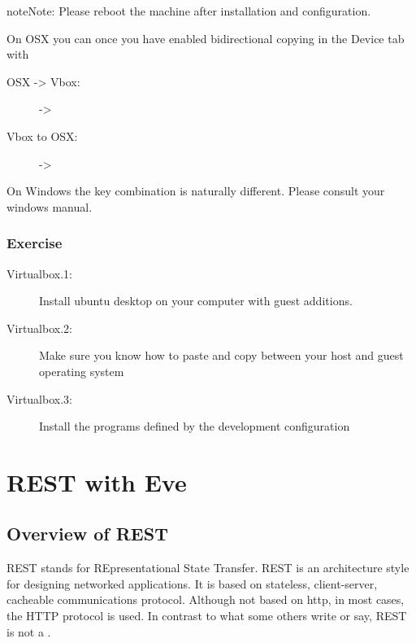 \begin{sphinxadmonition}{note}{Note:}
Please reboot the machine after installation and configuration.
\end{sphinxadmonition}

On OSX you can once you have enabled bidirectional copying in the
Device tab with
\begin{description}
\item[{OSX -\textgreater{} Vbox:}] \leavevmode
{}  -\textgreater{}   

\item[{Vbox to OSX:}] \leavevmode
{}   -\textgreater{}   

\end{description}

On Windows the key combination is naturally different. Please consult
your windows manual.


\subsubsection{Exercise}
\label{\detokenize{lesson/linux/virtualbox:exercise}}\begin{description}
\item[{Virtualbox.1:}] \leavevmode
Install ubuntu desktop on your computer with guest additions.

\item[{Virtualbox.2:}] \leavevmode
Make sure you know how to paste and copy between your host and
guest operating system

\item[{Virtualbox.3:}] \leavevmode
Install the programs defined by the development configuration

\end{description}


\section{REST with Eve}
\label{\detokenize{lesson/prg/rest:rest-with-eve}}\label{\detokenize{lesson/prg/rest::doc}}

\subsection{Overview of REST}
\label{\detokenize{lesson/prg/rest:overview-of-rest}}
REST stands for REpresentational State Transfer. REST is an
architecture style for designing networked applications. It is based
on stateless, client-server, cacheable communications
protocol. Although not based on http, in most cases, the HTTP protocol
is used.  In contrast to what some others write or say, REST is not a
.

